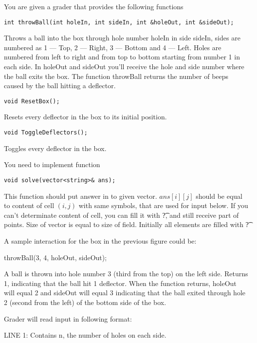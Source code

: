 You are given a grader that provides the following functions

\begin{verbatim}
int throwBall(int holeIn, int sideIn, int &holeOut, int &sideOut);
\end{verbatim}

Throws a ball into the box through hole number holeIn in side sideIn, sides are numbered as 1 --- Top, 2 --- Right, 3 --- Bottom and 4 --- Left. Holes are numbered from left to right and from top to bottom starting from number 1 in
each side. In holeOut and sideOut you'll receive the hole and side number where the ball exits the box. The function throwBall returns the number of beeps caused
by the ball hitting a deflector.

\begin{verbatim}
void ResetBox();
\end{verbatim}

Resets every deflector in the box to its initial position.

\begin{verbatim}
void ToggleDeflectors();
\end{verbatim}

Toggles every deflector in the box.

You need to implement function

\begin{verbatim}
void solve(vector<string>& ans);
\end{verbatim}

This function should put answer in to given vector. $ans[i][j]$ should be equal to content of cell $(i, j)$ with same symbols, that are used for input below. If you can't determinate content of cell, you can fill it with \t{?}, and still receive part of points. Size of vector is equal to size of field. Initially all elements are filled with \t{?}

A sample interaction for the box in the previous figure could be:

throwBall(3, 4, holeOut, sideOut);

A ball is thrown into hole number 3 (third from the top) on the left side. Returns 1, indicating that the ball hit 1 deflector. When the function returns, holeOut will equal 2 and sideOut will equal 3 indicating that the ball exited through hole 2 (second from the left) of the bottom side of the box.


Grader will read input in following format:

LINE 1: Contains n, the number of holes on each side.

